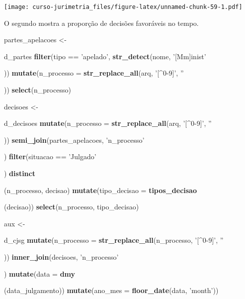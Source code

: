 \documentclass[]{book}
\newenvironment{Shaded}{\begin{snugshade}}{\end{snugshade}}
\newcommand{\KeywordTok}[1]{\textcolor[rgb]{0.13,0.29,0.53}{\textbf{{#1}}}}
\newcommand{\DataTypeTok}[1]{\textcolor[rgb]{0.13,0.29,0.53}{{#1}}}
\newcommand{\StringTok}[1]{\textcolor[rgb]{0.31,0.60,0.02}{{#1}}}
\newcommand{\NormalTok}[1]{{#1}}
\begin{document}
\texttt{[image: curso-jurimetria\_files/figure-latex/unnamed-chunk-59-1.pdf]}

O segundo mostra a proporção de decisões favoráveis no tempo.

\begin{Shaded}
\begin{Highlighting}[]
\NormalTok{partes_apelacoes <-}\StringTok{ }\NormalTok{d_partes %>%}\StringTok{ }
\StringTok{  }\KeywordTok{filter}\NormalTok{(tipo ==}\StringTok{ 'apelado'}\NormalTok{, }\KeywordTok{str_detect}\NormalTok{(nome, }\StringTok{'[Mm]inist'}\NormalTok{)) %>%}\StringTok{ }
\StringTok{  }\KeywordTok{mutate}\NormalTok{(}\DataTypeTok{n_processo =} \KeywordTok{str_replace_all}\NormalTok{(arq, }\StringTok{'[^0-9]'}\NormalTok{, }\StringTok{''}\NormalTok{)) %>%}\StringTok{ }
\StringTok{  }\KeywordTok{select}\NormalTok{(n_processo)}
  
\NormalTok{decisoes <-}\StringTok{ }\NormalTok{d_decisoes %>%}\StringTok{ }
\StringTok{  }\KeywordTok{mutate}\NormalTok{(}\DataTypeTok{n_processo =} \KeywordTok{str_replace_all}\NormalTok{(arq, }\StringTok{'[^0-9]'}\NormalTok{, }\StringTok{''}\NormalTok{)) %>%}\StringTok{ }
\StringTok{  }\KeywordTok{semi_join}\NormalTok{(partes_apelacoes, }\StringTok{'n_processo'}\NormalTok{) %>%}\StringTok{ }
\StringTok{  }\KeywordTok{filter}\NormalTok{(situacao ==}\StringTok{ 'Julgado'}\NormalTok{) %>%}\StringTok{ }
\StringTok{  }\KeywordTok{distinct}\NormalTok{(n_processo, decisao) %>%}
\StringTok{  }\KeywordTok{mutate}\NormalTok{(}\DataTypeTok{tipo_decisao =} \KeywordTok{tipos_decisao}\NormalTok{(decisao)) %>%}\StringTok{ }
\StringTok{  }\KeywordTok{select}\NormalTok{(n_processo, tipo_decisao)}
  

\NormalTok{aux <-}\StringTok{ }\NormalTok{d_cjsg %>%}
\StringTok{  }\KeywordTok{mutate}\NormalTok{(}\DataTypeTok{n_processo =} \KeywordTok{str_replace_all}\NormalTok{(n_processo, }\StringTok{'[^0-9]'}\NormalTok{, }\StringTok{''}\NormalTok{)) %>%}\StringTok{ }
\StringTok{  }\KeywordTok{inner_join}\NormalTok{(decisoes, }\StringTok{'n_processo'}\NormalTok{) %>%}\StringTok{ }
\StringTok{  }\KeywordTok{mutate}\NormalTok{(}\DataTypeTok{data =} \KeywordTok{dmy}\NormalTok{(data_julgamento)) %>%}
\StringTok{  }\KeywordTok{mutate}\NormalTok{(}\DataTypeTok{ano_mes =} \KeywordTok{floor_date}\NormalTok{(data, }\StringTok{'month'}\NormalTok{))}

}}}}}}}}}}}}}
\end{Highlighting}
\end{Shaded}
\end{document}
